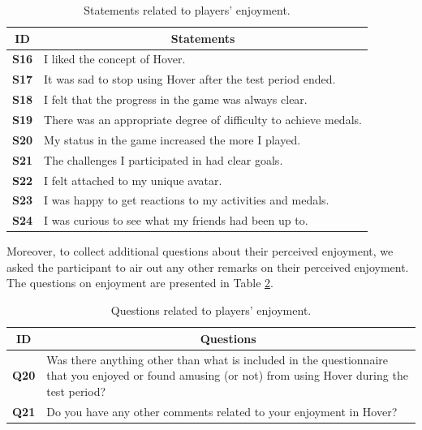 \begin{table}[H]
    \centering
    \begin{tabularx}{0.95\textwidth}{|c|X|}
        \hline
        \textbf{ID} & \multicolumn{1}{c|}{\textbf{Statements}} \\ \hline
        \textbf{S16} & I liked the concept of Hover. \\
        \textbf{S17} & It was sad to stop using Hover after the test period ended. \\
        \textbf{S18} & I felt that the progress in the game was always clear. \\
        \textbf{S19} & There was an appropriate degree of difficulty to achieve medals. \\
        \textbf{S20} & My status in the game increased the more I played. \\
        \textbf{S21} & The challenges I participated in had clear goals. \\
        \textbf{S22} & I felt attached to my unique avatar. \\
        \textbf{S23} & I was happy to get reactions to my activities and medals. \\
        \textbf{S24} & I was curious to see what my friends had been up to. \\
         \hline
    \end{tabularx}
    \caption{Statements related to players' enjoyment.}
    \label{tab:player_enjoyment_statements}
\end{table}

Moreover, to collect additional questions about their perceived enjoyment, we asked the participant to air out any other remarks on their perceived enjoyment. The questions on enjoyment are presented in Table \ref{tab:player_enjoyment_questions}.

\begin{table}[H]
    \centering
    \begin{tabularx}{0.95\textwidth}{|c|X|}
        \hline
        \textbf{ID} & \multicolumn{1}{c|}{\textbf{Questions}} \\ \hline
        \textbf{Q20} & Was there anything other than what is included in the questionnaire that you enjoyed or found amusing (or not) from using Hover during the test period? \\
        \textbf{Q21} & Do you have any other comments related to your enjoyment in Hover? \\ \hline
    \end{tabularx}
    \caption{Questions related to players' enjoyment.}
    \label{tab:player_enjoyment_questions}
\end{table}

